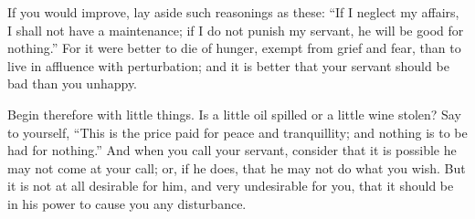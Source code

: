 If you would improve, lay aside such reasonings as these: ``If I neglect
my affairs, I shall not have a maintenance; if I do not punish my
servant, he will be good for nothing.'' For it were better to die of
hunger, exempt from grief and fear, than to live in affluence with
perturbation; and it is better that your servant should be bad than you
unhappy.

Begin therefore with little things. Is a little oil spilled or a little
wine stolen? Say to yourself, ``This is the price paid for peace and
tranquillity; and nothing is to be had for nothing.'' And when you call
your servant, consider that it is possible he may not come at your call;
or, if he does, that he may not do what you wish. But it is not at all
desirable for him, and very undesirable for you, that it should be in his
power to cause you any disturbance.
